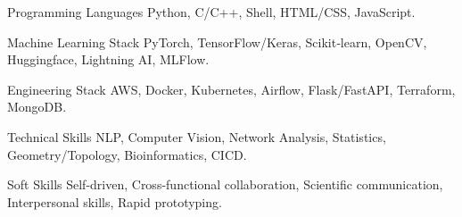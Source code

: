 

\begin{cvskills}

  \cvskill
    {Programming Languages} %
    {Python, C/C++, Shell, HTML/CSS, JavaScript.} %

  \cvskill
    {Machine Learning Stack} %
    {PyTorch, TensorFlow/Keras, Scikit‑learn, OpenCV, Huggingface, Lightning AI, MLFlow.} %

  \cvskill
    {Engineering Stack} %
    {AWS, Docker, Kubernetes, Airflow, Flask/FastAPI, Terraform, MongoDB.} %
    
  \cvskill
    {Technical Skills} %
    {NLP, Computer Vision, Network Analysis, Statistics, Geometry/Topology, Bioinformatics, CICD.} %

  \cvskill
    {Soft Skills} %
    {Self-driven, Cross-functional collaboration, Scientific communication, Interpersonal skills, Rapid prototyping.} %

\end{cvskills}
